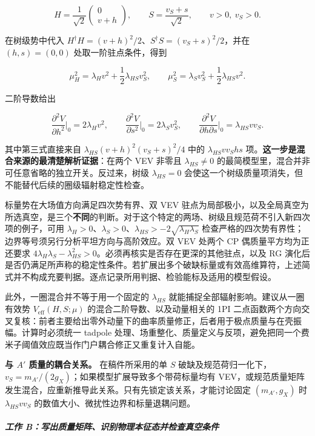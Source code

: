 \documentclass[
]{article}
\begin{document}
\[
H=\frac{1}{\sqrt2}\begin{pmatrix}0\\v+h\end{pmatrix},\qquad
S=\frac{v_S+s}{\sqrt2},\qquad v>0,\ v_S>0.
\]

在树级势中代入
\(H^\dagger H=(v+h)^2/2\)、\(S^\dagger S=(v_S+s)^2/2\)，并在
\((h,s)=(0,0)\) 处取一阶驻点条件，得到

\[
\mu_H^2=\lambda_Hv^2+\frac12\lambda_{HS}v_S^2,\qquad
\mu_S^2=\lambda_Sv_S^2+\frac12\lambda_{HS}v^2.
\]

二阶导数给出

\[
\frac{\partial^2V}{\partial h^2}\Big|_0=2\lambda_Hv^2,\qquad
\frac{\partial^2V}{\partial s^2}\Big|_0=2\lambda_Sv_S^2,\qquad
\frac{\partial^2V}{\partial h\partial s}\Big|_0=\lambda_{HS}vv_S.
\]

其中第三式直接来自 \(\lambda_{HS}(v+h)^2(v_S+s)^2/4\) 中的
\(\lambda_{HS}vv_S hs\)
项。\textbf{这一步是混合来源的最清楚解析证据}：在两个 VEV 非零且
\(\lambda_{HS}\ne0\)
的最简模型里，混合并非可任意省略的独立开关。反过来，树级
\(\lambda_{HS}=0\)
会使这一个树级质量项消失，但不能替代后续的圈级辐射稳定性检查。

标量势在大场值方向满足四次势有界、双 VEV
驻点为局部极小，以及全局真空为所选真空，是三个\textbf{不同}的判断。对于这个特定的两场、树级且规范荷不引入新四次项的例子，可用
\(\lambda_H>0\)、\(\lambda_S>0\)、\(\lambda_{HS}>-2\sqrt{\lambda_H\lambda_S}\)
检查严格的四次势有界性；边界等号须另行分析平坦方向与高阶效应。双 VEV
处两个 CP 偶质量平方均为正还要求
\(4\lambda_H\lambda_S-\lambda_{HS}^2>0\)。必须再核实是否存在更深的其他驻点，以及
RG
演化后是否仍满足所声称的稳定性条件。若扩展出多个破缺标量或有效高维算符，上述简式并不构成充要判据。逐点记录所用判据、检验能标及适用的模型假设。

此外，一圈混合并不等于用一个固定的 \(\lambda_{HS}\)
就能捕捉全部辐射影响。建议从一圈有效势 \(V_{\mathrm{eff}}(H,S;\mu)\)
的混合二阶导数、以及动量相关的 1PI
二点函数两个方向交叉复核：前者主要给出零外动量下的曲率质量修正，后者用于极点质量与在壳振幅。计算时必须统一
tadpole
处理、场重整化、质量定义与反项，避免把同一个费米子阈值效应既当作门户耦合修正又重复计入自能。

\textbf{与 \(A'\) 质量的耦合关系。} 在稿件所采用的单 \(S\)
破缺及规范荷归一化下，\(v_S=m_{A'}/(2g_X)\)；如果模型扩展导致多个带荷标量均有
VEV，或规范质量矩阵发生混合，应重新推导此关系。只有先锁定该关系，才能讨论固定
\((m_{A'},g_X)\) 时 \(\lambda_{HS}vv_S\)
的数值大小、微扰性边界和标量退耦问题。

\subparagraph{工作
B：写出质量矩阵、识别物理本征态并检查真空条件}\label{ux5de5ux4f5c-bux5199ux51faux8d28ux91cfux77e9ux9635ux8bc6ux522bux7269ux7406ux672cux5f81ux6001ux5e76ux68c0ux67e5ux771fux7a7aux6761ux4ef6}
\end{document}
